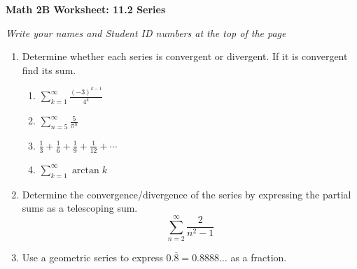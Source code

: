 \documentclass[12pt,fleqn]{article}
\begin{document}
\begin{center}
	\textbf{Math 2B Worksheet: 11.2 Series}
\end{center}

\emph{Write your names and Student ID numbers at the top of the page}

\begin{enumerate}

\item Determine whether each series is convergent or divergent. If it is convergent find its sum.
\begin{enumerate}
\item $\displaystyle \sum_{k=1}^\infty\frac{(-3)^{k-1}}{4^k}$\vfill

\item $\displaystyle \sum_{n=5}^\infty\frac{5}{\pi^n}$\vfill



\item $\displaystyle \frac{1}{3}+\frac{1}{6}+\frac{1}{9}+\frac{1}{12}+\cdots$\vfill

\item $\displaystyle \sum_{k=1}^\infty\arctan k$\vfill
\end{enumerate}

\newpage
\item Determine the convergence/divergence of the series by expressing the partial sums as a telescoping sum.
\[\sum_{n=2}^\infty\frac{2}{n^2-1}\]

\vfill

\item Use a geometric series to express $0.\overline{8}=0.8888\dots$ as a fraction.

\vfill

\end{enumerate}
\end{document}
